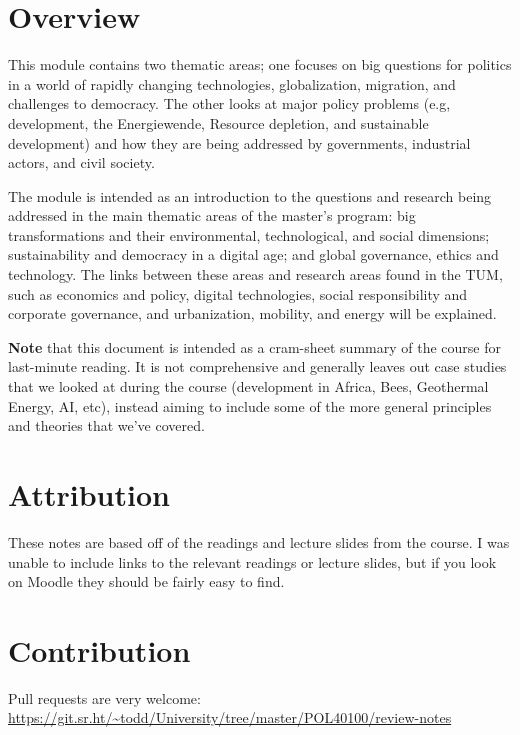 \section*{Overview}

This module contains two thematic areas; one focuses on big questions
for politics in a world of rapidly changing technologies,
globalization, migration, and challenges to democracy. The other looks
at major policy problems (e.g, development, the Energiewende, Resource
depletion, and sustainable development) and how they are being
addressed by governments, industrial actors, and civil society.

The module is intended as an introduction to the questions and
research being addressed in the main thematic areas of the master's
program: big transformations and their environmental, technological,
and social dimensions; sustainability and democracy in a digital age;
and global governance, ethics and technology. The links between these
areas and research areas found in the TUM, such as economics and
policy, digital technologies, social responsibility and corporate
governance, and urbanization, mobility, and energy will be explained.

\textbf{Note} that this document is intended as a cram-sheet summary
of the course for last-minute reading. It is not comprehensive and
generally leaves out case studies that we looked at during the course
(development in Africa, Bees, Geothermal Energy, AI, etc), instead
aiming to include some of the more general principles and theories
that we've covered.

\section*{Attribution}

These notes are based off of the readings and lecture slides from the
course. I was unable to include links to the relevant readings or
lecture slides, but if you look on Moodle they should be fairly easy
to find.

\section*{Contribution}

Pull requests are very welcome:
\url{https://git.sr.ht/~todd/University/tree/master/POL40100/review-notes}
